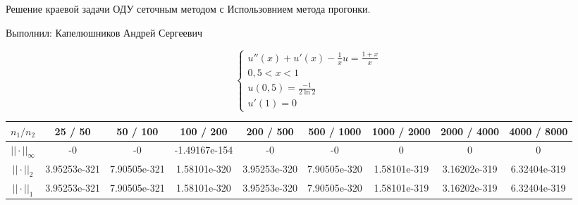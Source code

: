\documentclass[a4paper]{article}
\begin{document}
 
\renewcommand{\arraystretch}{2} 
\begin{center} 
{\Large Решение краевой задачи ОДУ сеточным методом с Использовнием метода прогонки.} 
\bigskip 
\end{center} 
Выполнил: Капелюшников Андрей Сергеевич 
 
\begin{equation*} 
\begin{cases} 
u'' (x) + u' (x) - \frac{1}{x}u=\frac{1+x}{x} 
\\ 
0,5 < x <1 
\\ 
u(0,5)=\frac{-1}{2 \ln2} 
\\ 
u'(1)=0 
\end{cases} 
\end{equation*} 
\begin{table}[h!] 
\begin{tabular}{ccccccccc} 
\hline 
$n_1/n_2$  & 25 / 50  & 50 / 100  & 100 / 200  & 200 / 500  & 500 / 1000  & 1000 / 2000  & 2000 / 4000  & 4000 / 8000 \\ 
\hline 
 $||\cdot||_{\infty}$  & -0 & -0 & -1.49167e-154 & -0 & -0 & 0 & 0 & 0\\ 
\hline 
 $||\cdot||_{2}$  & 3.95253e-321 & 7.90505e-321 & 1.58101e-320 & 3.95253e-320 & 7.90505e-320 & 1.58101e-319 & 3.16202e-319 & 6.32404e-319\\ 
\hline 
 $||\cdot||_{1}$  & 3.95253e-321 & 7.90505e-321 & 1.58101e-320 & 3.95253e-320 & 7.90505e-320 & 1.58101e-319 & 3.16202e-319 & 6.32404e-319\\ 
\hline 
\end{tabular} 
\end{table} 
\end{document}

